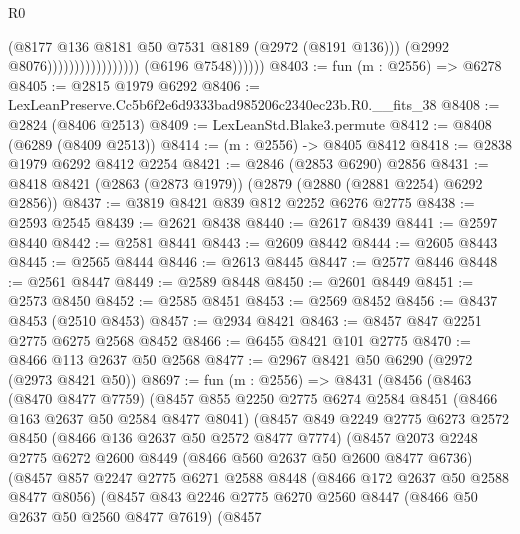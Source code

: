 \begin{lexlean}{R0}
\begin{coremodule}
                                              (@8177
                                                @136
                                                @8181
                                                @50
                                                @7531
                                                @8189
                                                (@2972 (@8191 @136)))
                                              (@2992 @8076)))))))))))))))))
              (@6196 @7548))))))
@8403 := fun (m : @2556) => @6278
@8405 := @2815 @1979 @6292
@8406 := LexLeanPreserve.Cc5b6f2e6d9333bad985206c2340ec23b.R0.__fits_38
@8408 := @2824 (@8406 @2513)
@8409 := LexLeanStd.Blake3.permute
@8412 := @8408 (@6289 (@8409 @2513))
@8414 := (m : @2556) -> @8405 @8412
@8418 := @2838 @1979 @6292 @8412 @2254
@8421 := @2846 (@2853 @6290) @2856
@8431 := @8418 @8421 (@2863 (@2873 @1979)) (@2879 (@2880 (@2881 @2254) @6292 @2856))
@8437 := @3819 @8421 @839 @812 @2252 @6276 @2775
@8438 := @2593 @2545
@8439 := @2621 @8438
@8440 := @2617 @8439
@8441 := @2597 @8440
@8442 := @2581 @8441
@8443 := @2609 @8442
@8444 := @2605 @8443
@8445 := @2565 @8444
@8446 := @2613 @8445
@8447 := @2577 @8446
@8448 := @2561 @8447
@8449 := @2589 @8448
@8450 := @2601 @8449
@8451 := @2573 @8450
@8452 := @2585 @8451
@8453 := @2569 @8452
@8456 := @8437 @8453 (@2510 @8453)
@8457 := @2934 @8421
@8463 := @8457 @847 @2251 @2775 @6275 @2568 @8452
@8466 := @6455 @8421 @101 @2775
@8470 := @8466 @113 @2637 @50 @2568
@8477 := @2967 @8421 @50 @6290 (@2972 (@2973 @8421 @50))
@8697 := fun (m : @2556) =>
  @8431
    (@8456
      (@8463
        (@8470 @8477 @7759)
        (@8457
          @855
          @2250
          @2775
          @6274
          @2584
          @8451
          (@8466 @163 @2637 @50 @2584 @8477 @8041)
          (@8457
            @849
            @2249
            @2775
            @6273
            @2572
            @8450
            (@8466 @136 @2637 @50 @2572 @8477 @7774)
            (@8457
              @2073
              @2248
              @2775
              @6272
              @2600
              @8449
              (@8466 @560 @2637 @50 @2600 @8477 @6736)
              (@8457
                @857
                @2247
                @2775
                @6271
                @2588
                @8448
                (@8466 @172 @2637 @50 @2588 @8477 @8056)
                (@8457
                  @843
                  @2246
                  @2775
                  @6270
                  @2560
                  @8447
                  (@8466 @50 @2637 @50 @2560 @8477 @7619)
                  (@8457

\end{coremodule}
\end{lexlean}
